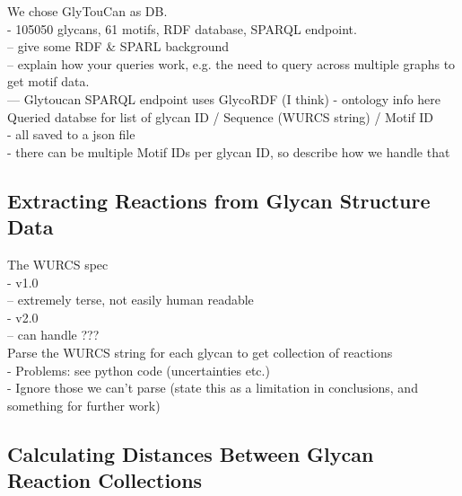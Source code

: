 \documentclass[12pt,a4paper]{article}
\begin{document}
We chose GlyTouCan as DB.\\
- 105050 glycans, 61 motifs, RDF database, SPARQL endpoint.\\
-- give some RDF \& SPARL background\\
-- explain how your queries work, e.g. the need to query across multiple graphs to get motif data.\\
--- Glytoucan SPARQL endpoint uses GlycoRDF (I think) - ontology info here  \\

Queried databse for list of glycan ID / Sequence (WURCS string) / Motif ID\\
- all saved to a json file \\
- there can be multiple Motif IDs per glycan ID, so describe how we handle that\\

\subsection{Extracting Reactions from Glycan Structure Data}
\label{sec:extracting_reactions}

The WURCS spec\\
- v1.0\\
-- extremely terse, not easily human readable\\
- v2.0\\
-- can handle ???\\

Parse the WURCS string for each glycan to get collection of reactions\\
- Problems: see python code (uncertainties etc.)\\
- Ignore those we can't parse (state this as a limitation in conclusions, and something for further work)\\

\subsection{Calculating Distances Between Glycan Reaction Collections}
\label{sec:distance_calc_set}
\end{document}
